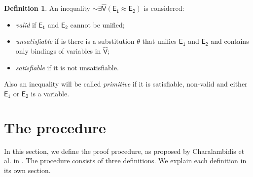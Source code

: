 \documentclass[inscr,ack,preface]{dithesis}
\theoremstyle{definition}
\newtheorem{definition}{Definition}[]
\newcommand{\msf}[1]{$\mathsf{#1}$}
\begin{document}
\begin{definition}{}
\label{def:inequalities}
An inequality \msf{\sim\exists \widehat{V} \left( E_1 \approx E_2 \right)} is considered:
\begin{itemize}
  \item \emph{valid} if \msf{E_1} and \msf{E_2} cannot be unified;
  \item \emph{unsatisfiable} if is there is a substitution $\theta$ that unifies \msf{E_1} and \msf{E_2} and contains only bindings of variables in \msf{\widehat{V}};
  \item \emph{satisfiable} if it is not unsatisfiable.
\end{itemize}
Also an inequality will be called \emph{primitive} if it is satisfiable, non-valid and either \msf{E_1} or \msf{E_2} is a variable.

\end{definition}

\section{The procedure}
In this section, we define the proof procedure, as proposed by Charalambidis et al. in \cite{DBLP:conf/kr/CharalambidisR14}. The procedure consists of three definitions. We explain each definition in its own section.
\end{document}
